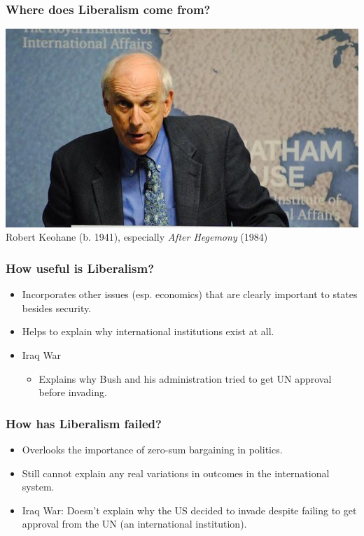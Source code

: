 \documentclass[handout]{beamer}
\begin{document}
\begin{frame} 
\frametitle{\LARGE{Where does Liberalism come from?}}
    \centering
\includegraphics[width=\textwidth,height=0.8\textheight,keepaspectratio]{keohane.jpeg}
Robert Keohane (b. 1941), especially \textit{After Hegemony} (1984)
\end{frame}


\begin{frame} 
\frametitle{\LARGE{How useful is Liberalism?}}
    \begin{itemize}
        \item Incorporates other issues (esp. economics) that are clearly important to states besides security. \pause
        \item Helps to explain why international institutions exist at all. \pause
        \item Iraq War \pause 
        \begin{itemize}
            \item Explains why Bush and his administration tried to get UN approval before invading. 
        \end{itemize}
    \end{itemize}
\end{frame}

\begin{frame} 
\frametitle{\LARGE{How has Liberalism failed?}}
\begin{itemize}
    \item Overlooks the importance of zero-sum bargaining in politics. \pause
    \item Still cannot explain any real variations in outcomes in the international system. \pause
    \item Iraq War: \pause Doesn't explain why the US decided to invade despite failing to get approval from the UN (an international institution).
\end{itemize}
\end{frame}
\end{document}
